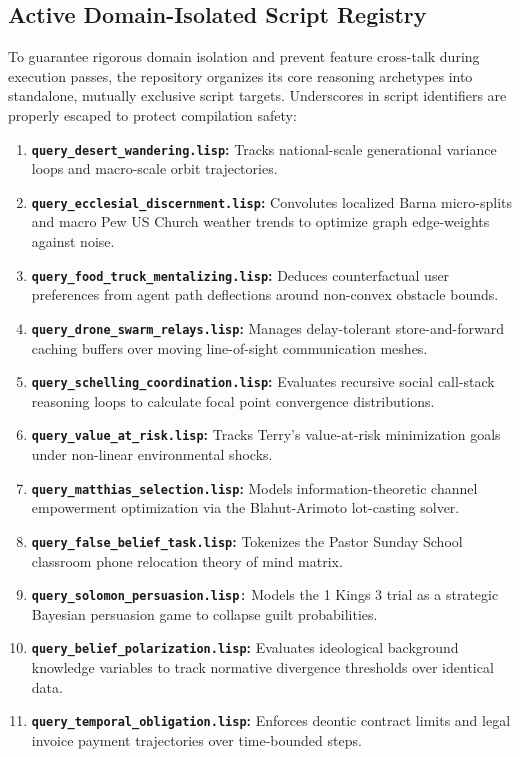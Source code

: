 \documentclass[11pt,fleqn]{article}
\begin{document}
\subsection{Active Domain-Isolated Script Registry}
To guarantee rigorous domain isolation and prevent feature cross-talk during execution passes, the repository organizes its core reasoning archetypes into standalone, mutually exclusive script targets. Underscores in script identifiers are properly escaped to protect compilation safety:
\begin{enumerate}
    \item \textbf{\texttt{query\_desert\_wandering.lisp}:} Tracks national-scale generational variance loops and macro-scale orbit trajectories.
    \item \textbf{\texttt{query\_ecclesial\_discernment.lisp}:} Convolutes localized Barna micro-splits and macro Pew US Church weather trends to optimize graph edge-weights against noise.
    \item \textbf{\texttt{query\_food\_truck\_mentalizing.lisp}:} Deduces counterfactual user preferences from agent path deflections around non-convex obstacle bounds.
    \item \textbf{\texttt{query\_drone\_swarm\_relays.lisp}:} Manages delay-tolerant store-and-forward caching buffers over moving line-of-sight communication meshes.
    \item \textbf{\texttt{query\_schelling\_coordination.lisp}:} Evaluates recursive social call-stack reasoning loops to calculate focal point convergence distributions.
    \item \textbf{\texttt{query\_value\_at\_risk.lisp}:} Tracks Terry's value-at-risk minimization goals under non-linear environmental shocks.
    \item \textbf{\texttt{query\_matthias\_selection.lisp}:} Models information-theoretic channel empowerment optimization via the Blahut-Arimoto lot-casting solver.
    \item \textbf{\texttt{query\_false\_belief\_task.lisp}:} Tokenizes the Pastor Sunday School classroom phone relocation theory of mind matrix.
    \item \texttt{\textbf{query\_solomon\_persuasion.lisp}:} Models the 1 Kings 3 trial as a strategic Bayesian persuasion game to collapse guilt probabilities.
    \item \textbf{\texttt{query\_belief\_polarization.lisp}:} Evaluates ideological background knowledge variables to track normative divergence thresholds over identical data.
    \item \textbf{\texttt{query\_temporal\_obligation.lisp}:} Enforces deontic contract limits and legal invoice payment trajectories over time-bounded steps.
\end{enumerate}
\end{document}
